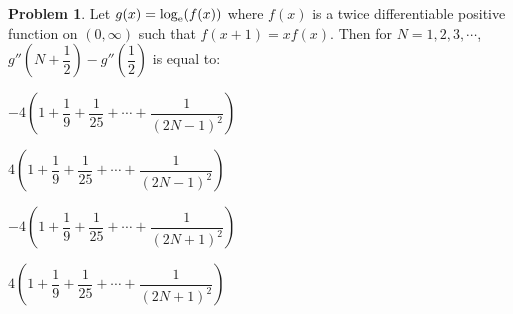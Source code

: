 \documentclass[14]{article}
\theoremstyle{definition}
\newtheorem{prob}{Problem}
\theoremstyle{case}
\begin{document}
\begin{prob}
Let $g(x) = \log_{\rm e}(f(x))$ where $f(x)$ is a twice differentiable positive function on $(0, \infty)$ such that $f(x + 1) = x f(x)$. Then for $N = 1, 2, 3, \cdots$, $g''\left(N + \dfrac12\right) - g''\left(\dfrac12\right)$ is equal to:\\
\begin{enumerate*}[label=(\Alph*)]
\item $-4 \left(1 + \dfrac19 + \dfrac{1}{25} + \cdots + \dfrac{1}{(2N-1)^2} \right)$\;\;
\item $4 \left(1 + \dfrac19 + \dfrac{1}{25} + \cdots + \dfrac{1}{(2N-1)^2} \right)$\\
\item $-4 \left(1 + \dfrac19 + \dfrac{1}{25} + \cdots + \dfrac{1}{(2N+1)^2} \right)$\;\;
\item $4 \left(1 + \dfrac19 + \dfrac{1}{25} + \cdots + \dfrac{1}{(2N+1)^2} \right)$
\end{enumerate*}

\end{prob}
\end{document}
